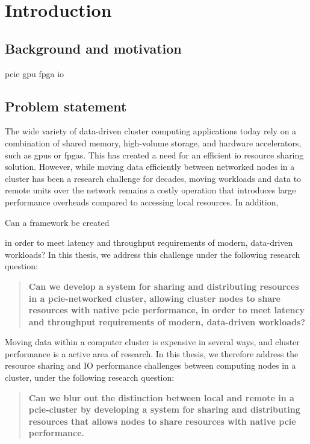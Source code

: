 \chapter{Introduction}\label{sec:intro}
\section{Background and motivation}
\gls{pcie}
\gls{gpu}
\gls{fpga}
\gls{io}

\section{Problem statement}\label{sec:objectives}
The wide variety of data-driven cluster computing applications today rely on a combination of shared memory, high-volume storage, and hardware accelerators, such as \glspl{gpu} or \glspl{fpga}.
This has created a need for an efficient \gls{io} resource sharing solution.
%
However, while moving data efficiently between networked nodes in a cluster has been a research challenge for decades, moving workloads and data to remote units over the network remains a costly operation that introduces large performance overheads compared to accessing local resources.
%
In addition, \cite{Taherkordi2018}

Can a framework be created

	in order to meet latency and throughput requirements of modern, data-driven workloads?
In this thesis, we address this challenge under the following research question:
\begin{quote}\bfseries
	Can we develop a system for sharing and distributing resources in a \gls{pcie}-networked cluster, allowing cluster nodes to share resources with native \gls{pcie} performance,
	in order to meet latency and throughput requirements of modern, data-driven workloads?
\end{quote}

Moving data within a computer cluster is expensive in several ways, and cluster performance is a active area of research. 
In this thesis, we therefore address the resource sharing and IO performance challenges between computing nodes in a cluster, under the following research question: 

\begin{quote}\label{q2}\bfseries
	Can we blur out the distinction between local and remote in a \gls{pcie}-cluster by developing a system for sharing and distributing resources
	that allows nodes to share resources with native \gls{pcie} performance.
\end{quote}

